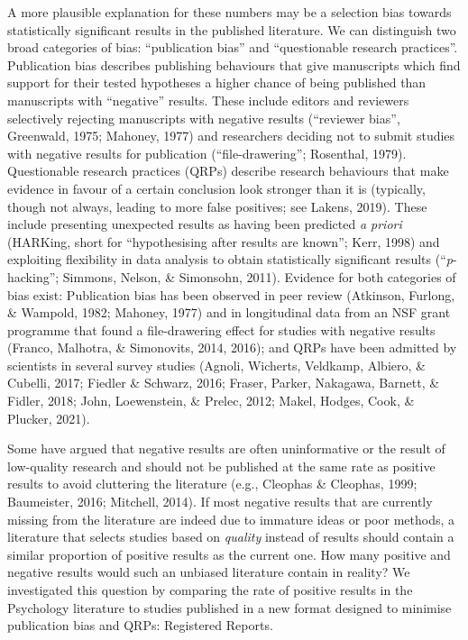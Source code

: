 \documentclass[british,,jou,floatsintext]{apa6}
\begin{document}
A more plausible explanation for these numbers may be a selection bias towards statistically significant results in the published literature.
We can distinguish two broad categories of bias: \enquote{publication bias} and \enquote{questionable research practices}.
Publication bias describes publishing behaviours that give manuscripts which find support for their tested hypotheses a higher chance of being published than manuscripts with \enquote{negative} results.
These include editors and reviewers selectively rejecting manuscripts with negative results (``reviewer bias'', Greenwald, 1975; Mahoney, 1977) and researchers deciding not to submit studies with negative results for publication (``file-drawering''; Rosenthal, 1979).
Questionable research practices (QRPs) describe research behaviours that make evidence in favour of a certain conclusion look stronger than it is (typically, though not always, leading to more false positives; see Lakens, 2019).
These include presenting unexpected results as having been predicted \emph{a priori} (HARKing, short for ``hypothesising after results are known''; Kerr, 1998) and exploiting flexibility in data analysis to obtain statistically significant results (``\emph{p}-hacking''; Simmons, Nelson, \& Simonsohn, 2011).
Evidence for both categories of bias exist:
Publication bias has been observed in peer review (Atkinson, Furlong, \& Wampold, 1982; Mahoney, 1977) and in longitudinal data from an NSF grant programme that found a file-drawering effect for studies with negative results (Franco, Malhotra, \& Simonovits, 2014, 2016); and QRPs have been admitted by scientists in several survey studies (Agnoli, Wicherts, Veldkamp, Albiero, \& Cubelli, 2017; Fiedler \& Schwarz, 2016; Fraser, Parker, Nakagawa, Barnett, \& Fidler, 2018; John, Loewenstein, \& Prelec, 2012; Makel, Hodges, Cook, \& Plucker, 2021).

Some have argued that negative results are often uninformative or the result of low-quality research and should not be published at the same rate as positive results to avoid cluttering the literature (e.g., Cleophas \& Cleophas, 1999; Baumeister, 2016; Mitchell, 2014).
If most negative results that are currently missing from the literature are indeed due to immature ideas or poor methods, a literature that selects studies based on \emph{quality} instead of results should contain a similar proportion of positive results as the current one.
How many positive and negative results would such an unbiased literature contain in reality?
We investigated this question by comparing the rate of positive results in the Psychology literature to studies published in a new format designed to minimise publication bias and QRPs: Registered Reports.
\end{document}
